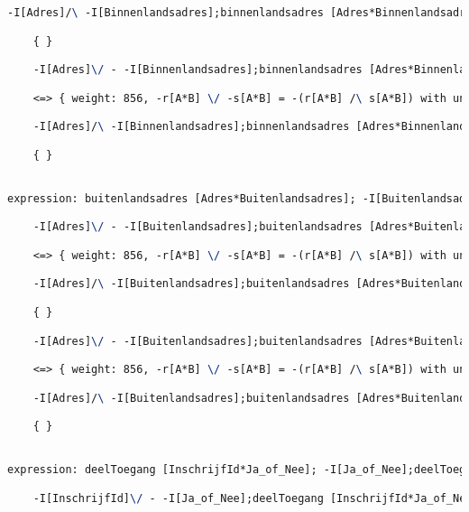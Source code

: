 \begin{lstlisting}[language=TeX]
    -I[Adres]/\ -I[Binnenlandsadres];binnenlandsadres [Adres*Binnenlandsadres]~;binnenlandsadres [Adres*Binnenlandsadres]

    { }

    -I[Adres]\/ - -I[Binnenlandsadres];binnenlandsadres [Adres*Binnenlandsadres]~;binnenlandsadres [Adres*Binnenlandsadres]

    <=> { weight: 856, -r[A*B] \/ -s[A*B] = -(r[A*B] /\ s[A*B]) with unifier: {A->I[Adres], B->I[Adres], r->I[Adres], s->binnenlandsadres [Adres*Binnenlandsadres];-I[Binnenlandsadres];binnenlandsadres [Adres*Binnenlandsadres]~} }

    -I[Adres]/\ -I[Binnenlandsadres];binnenlandsadres [Adres*Binnenlandsadres]~;binnenlandsadres [Adres*Binnenlandsadres]

    { }


expression: buitenlandsadres [Adres*Buitenlandsadres]; -I[Buitenlandsadres];buitenlandsadres [Adres*Buitenlandsadres]~ |- -I[Adres]

    -I[Adres]\/ - -I[Buitenlandsadres];buitenlandsadres [Adres*Buitenlandsadres]~;buitenlandsadres [Adres*Buitenlandsadres]

    <=> { weight: 856, -r[A*B] \/ -s[A*B] = -(r[A*B] /\ s[A*B]) with unifier: {A->I[Adres], B->I[Adres], r->buitenlandsadres [Adres*Buitenlandsadres];-I[Buitenlandsadres];buitenlandsadres [Adres*Buitenlandsadres]~, s->I[Adres]} }

    -I[Adres]/\ -I[Buitenlandsadres];buitenlandsadres [Adres*Buitenlandsadres]~;buitenlandsadres [Adres*Buitenlandsadres]

    { }

    -I[Adres]\/ - -I[Buitenlandsadres];buitenlandsadres [Adres*Buitenlandsadres]~;buitenlandsadres [Adres*Buitenlandsadres]

    <=> { weight: 856, -r[A*B] \/ -s[A*B] = -(r[A*B] /\ s[A*B]) with unifier: {A->I[Adres], B->I[Adres], r->I[Adres], s->buitenlandsadres [Adres*Buitenlandsadres];-I[Buitenlandsadres];buitenlandsadres [Adres*Buitenlandsadres]~} }

    -I[Adres]/\ -I[Buitenlandsadres];buitenlandsadres [Adres*Buitenlandsadres]~;buitenlandsadres [Adres*Buitenlandsadres]

    { }


expression: deelToegang [InschrijfId*Ja_of_Nee]; -I[Ja_of_Nee];deelToegang [InschrijfId*Ja_of_Nee]~ |- -I[InschrijfId]

    -I[InschrijfId]\/ - -I[Ja_of_Nee];deelToegang [InschrijfId*Ja_of_Nee]~;deelToegang [InschrijfId*Ja_of_Nee]


\end{lstlisting}

